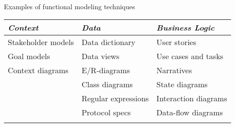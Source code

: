 \begin{Slide}{Examples of functional modeling techniques}
\begin{tabular}{l l  l}
\textbf{\emph{Context}} & \textbf{\emph{Data}}  & \textbf{\emph{Business Logic}}  \\ \hline
 Stakeholder models &  Data dictionary     & User stories\\
 Goal models &  Data views          & Use cases and tasks \\
 Context diagrams &  E/R-diagrams        & Narratives \\
  &  Class diagrams      & State diagrams \\
  &  Regular expressions & Interaction diagrams\\
  &  Protocol specs      & Data-flow diagrams \\
  &  \end{tabular}
\end{Slide}
